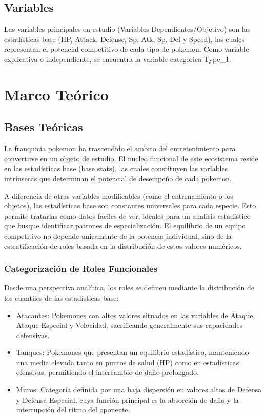 \documentclass[oneside,11pt]{Latex/Classes/PhDthesisPSnPDF}
\begin{document}
\section{Variables}

Las variables principales en estudio (Variables Dependientes/Objetivo)
son las estadísticas base (HP, Attack, Defense, Sp. Atk, Sp. Def y
Speed), las cuales representan el potencial competitivo de cada tipo de
pokemon. Como variable explicativa o independiente, se encuentra la
variable categorica Type\_1.

\chapter{Marco Teórico}

\section{Bases Teóricas}

La franquicia pokemon ha trascendido el ambito del entretenimiento para
convertirse en un objeto de estudio. El nucleo funcional de este
ecosistema reside en las estadisticas base (base stats), las cuales
constituyen las variables intrínsecas que determinan el potencial de
desempeño de cada pokemon.

A diferencia de otras variables modificables (como el entrenamiento o
los objetos), las estadísticas base son constantes universales para cada
especie. Esto permite tratarlas como datos faciles de ver, ideales para
un analisis estadistico que busque identificar patrones de
especialización. El equilibrio de un equipo competitivo no depende
unicamente de la potencia individual, sino de la estratificación de
roles basada en la distribución de estos valores numéricos.\\

\subsection{Categorización de Roles Funcionales}

Desde una perspectiva analítica, los roles se definen mediante la
distribución de los cuantiles de las estadísticas base:

\begin{itemize}
 \item {Atacantes: Pokemones con altos valores situados en las variables de Ataque, Ataque Especial y Velocidad, sacrificando generalmente sus capacidades defensivas.}
 \item {Tanques: Pokemones que presentan un equilibrio estadístico, manteniendo una media elevada tanto en puntos de salud (HP) como en estadísticas ofensivas, permitiendo el intercambio de daño prolongado.}
 \item {Muros: Categoría definida por una baja dispersión en valores altos de Defensa y Defensa Especial, cuya función principal es la absorción de daño y la interrupción del ritmo del oponente.} 
 \end{itemize}
\end{document}
